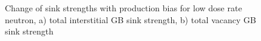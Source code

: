 \documentclass[a4paper]{article}
\begin{document}
\begin{figure}[h!]
                        
        \qquad
        \caption{Change of sink strengths with production bias for low dose rate neutron, a) total interstitial GB sink strength, b) total vacancy GB sink strength}
        \label{figure:sink_strengths_neutron_bias_k}
      \end{figure}
\end{document}
